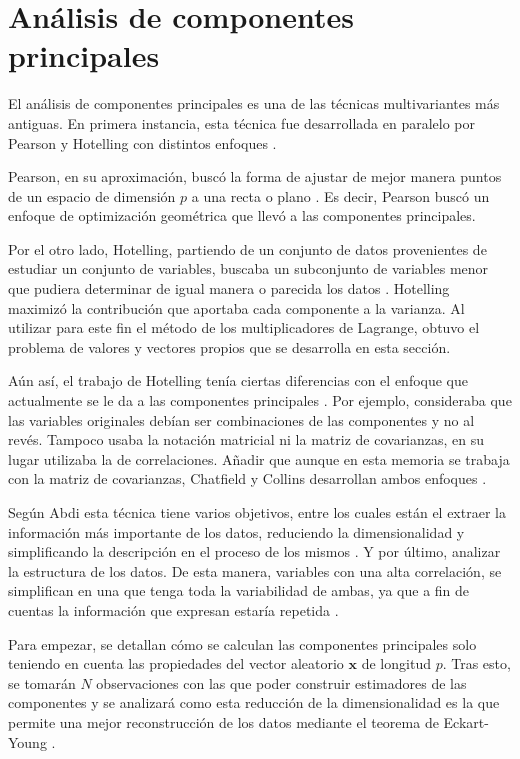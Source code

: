 \newpage
\section{Análisis de componentes principales}
\noindent El análisis de componentes principales es una de las técnicas multivariantes más antiguas. En primera instancia, esta técnica fue desarrollada en paralelo por Pearson y Hotelling  con distintos enfoques \cite{Pearson 1901, Hotelling 1933}. 

\noindent Pearson, en su aproximación, buscó la forma de ajustar de mejor manera puntos de un espacio de dimensión $p$ a una recta o plano \cite{Pearson 1901}. Es decir, Pearson buscó un enfoque de optimización geométrica que llevó a las componentes principales.

\noindent Por el otro lado, Hotelling, partiendo de un conjunto de datos provenientes de estudiar un conjunto de variables,  buscaba un subconjunto de variables menor que pudiera determinar de igual manera o parecida los datos \cite{Hotelling 1933}. Hotelling maximizó la contribución que aportaba cada componente a la varianza. Al utilizar para este fin el método de los multiplicadores de Lagrange, obtuvo el problema de valores y vectores propios que se desarrolla en esta sección. 

\noindent Aún así, el trabajo de Hotelling tenía ciertas diferencias con el enfoque que actualmente se le da a las componentes principales \cite{Jollife 1986}. Por ejemplo, consideraba que las variables originales  debían ser combinaciones de las componentes y no al revés. Tampoco usaba la notación matricial ni la matriz de covarianzas, en su lugar utilizaba la de correlaciones. Añadir que aunque en esta memoria se trabaja con la matriz de covarianzas, Chatfield y Collins desarrollan ambos enfoques \cite{Chatfield 1989}. 

\noindent Según Abdi  esta técnica tiene varios objetivos, entre los cuales están el extraer la información más importante de los datos, reduciendo la dimensionalidad y simplificando la descripción en el proceso de los mismos \cite{Abdi 2010}. Y por último, analizar la estructura de los datos.  De esta manera, variables con una alta correlación, se simplifican en una que tenga toda la variabilidad de ambas, ya que a fin de cuentas la información que expresan estaría repetida \cite{Chatfield 1989, Everitt 2011}. 

\noindent Para empezar, se detallan cómo se calculan las componentes principales solo teniendo en cuenta las propiedades del vector aleatorio $\mathbf{x}$ de longitud $p$. Tras esto, se tomarán $N$ observaciones con las que poder construir estimadores de las componentes y se analizará como esta reducción de la dimensionalidad es la que permite una mejor reconstrucción de los datos mediante el teorema de Eckart-Young \cite{Eckart 1936}. 

